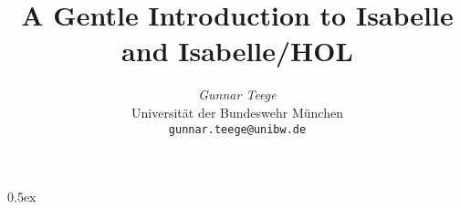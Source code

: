 \documentclass[11pt,a4paper]{report}
\begin{document}
\title{A Gentle Introduction to Isabelle\\ and Isabelle/HOL}
\author{{\em Gunnar Teege}\\
        Universität der Bundeswehr München \\
        \texttt{gunnar.teege@unibw.de}
}
\maketitle

\tableofcontents

\parindent 0pt\parskip 0.5ex



\begingroup
  \cleardoublepage
  
  \cbstart
  
\endgroup

\printindex
\cbend
\end{document}
